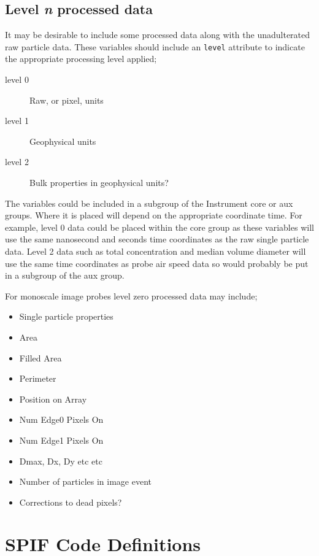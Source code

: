 \documentclass[12pt,a4paper]{article}
\begin{document}
\subsection{Level \textit{n} processed data}

It may be desirable to include some processed data along with the unadulterated raw particle data. These variables should include an \texttt{level} attribute to indicate the appropriate processing level applied;
\begin{description}
\item[level 0] Raw, or pixel, units
\item[level 1] Geophysical units
\item[level 2] Bulk properties in geophysical units?
\end{description}
\par
The variables could be included in a subgroup of the Instrument core or aux groups. Where it is placed will depend on the appropriate coordinate time. For example, level 0 data could be placed within the core group as these variables will use the same nanosecond and seconds time coordinates as the raw single particle data. Level 2 data such as total concentration and median volume diameter will use the same time coordinates as probe air speed data so would probably be put in a subgroup of the aux group.
\par
For monoscale image probes level zero processed data may include;
\begin{itemize}
\item Single particle properties 
\item Area
\item Filled Area
\item Perimeter
\item Position on Array
\item Num Edge0 Pixels On
\item Num Edge1 Pixels On
\item Dmax, Dx, Dy etc etc
\item Number of particles in image event
\item Corrections to dead pixels?
\end{itemize}


\section{SPIF Code Definitions}
\end{document}
